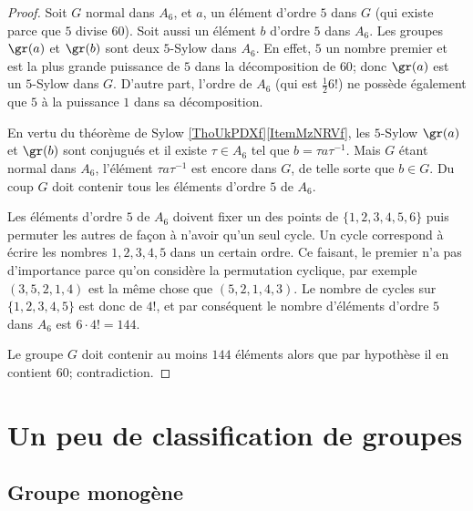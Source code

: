 \begin{proof}
    Soit \( G\) normal dans \( A_6\), et \( a\), un élément d'ordre \( 5\) dans \( G\) (qui existe parce que \( 5\) divise \( 60\)). Soit aussi un élément \( b\) d'ordre \( 5\) dans \( A_6\). Les groupes \( \gr(a)\) et \( \gr(b)\) sont deux \( 5\)-Sylow dans \( A_6\). En effet, \( 5\) un nombre premier et est la plus grande puissance de \( 5\) dans la décomposition de \( 60\); donc \( \gr(a)\) est un \( 5\)-Sylow dans \( G\). D'autre part, l'ordre de \( A_6\) (qui est \( \frac{ 1 }{2}6!\)) ne possède également que \( 5\) à la puissance \( 1\) dans sa décomposition.

    En vertu du théorème de Sylow \ref{ThoUkPDXf}\ref{ItemMzNRVf}, les \( 5\)-Sylow \( \gr(a)\) et \( \gr(b)\) sont conjugués et il existe \( \tau\in A_6\) tel que \( b=\tau a\tau^{-1}\). Mais \( G\) étant normal dans \( A_6\), l'élément \( \tau a\tau^{-1}\) est encore dans \( G\), de telle sorte que \( b\in G\). Du coup \( G\) doit contenir tous les éléments d'ordre \( 5\) de \( A_6\).

    Les éléments d'ordre $5$ de \( A_6\) doivent fixer un des points de \( \{ 1,2,3,4,5,6 \}\) puis permuter les autres de façon à n'avoir qu'un seul cycle. Un cycle correspond à écrire les nombres \( 1,2,3,4,5\) dans un certain ordre. Ce faisant, le premier n'a pas d'importance parce qu'on considère la permutation cyclique, par exemple \( (3,5,2,1,4)\) est la même chose que \( (5,2,1,4,3)\). Le nombre de cycles sur \( \{ 1,2,3,4,5 \}\) est donc de \( 4!\), et par conséquent le nombre d'éléments d'ordre \( 5\) dans \( A_6\) est \( 6\cdot 4!=144\).

    Le groupe \( G\) doit contenir au moins \( 144\) éléments alors que par hypothèse il en contient \( 60\); contradiction.
    
\end{proof}

\section{Un peu de classification de groupes}

\subsection{Groupe monogène}

